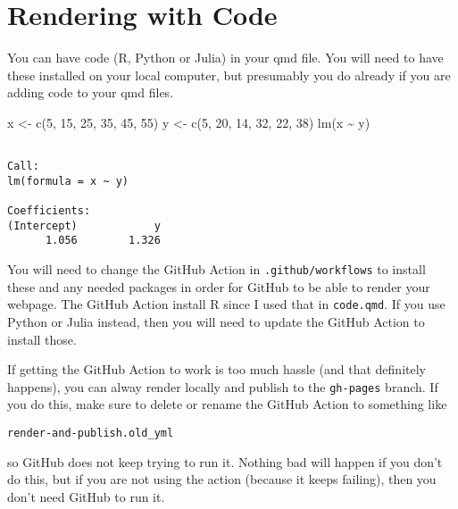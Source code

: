 \documentclass[
  11pt,
  letterpaper,
  oneside,
  open=any]{scrbook}
\newenvironment{Shaded}{\begin{snugshade}}{\end{snugshade}}
\newcommand{\DecValTok}[1]{\textcolor[rgb]{0.68,0.00,0.00}{#1}}
\newcommand{\FunctionTok}[1]{\textcolor[rgb]{0.28,0.35,0.67}{#1}}
\newcommand{\NormalTok}[1]{\textcolor[rgb]{0.00,0.23,0.31}{#1}}
\newcommand{\OtherTok}[1]{\textcolor[rgb]{0.00,0.23,0.31}{#1}}
\newcommand{\SpecialCharTok}[1]{\textcolor[rgb]{0.37,0.37,0.37}{#1}}
\begin{document}

\hypertarget{rendering-with-code}{%
\chapter{Rendering with Code}\label{rendering-with-code}}

You can have code (R, Python or Julia) in your qmd file. You will need
to have these installed on your local computer, but presumably you do
already if you are adding code to your qmd files.

\begin{Shaded}
\begin{Highlighting}[]
\NormalTok{x }\OtherTok{\textless{}{-}} \FunctionTok{c}\NormalTok{(}\DecValTok{5}\NormalTok{, }\DecValTok{15}\NormalTok{, }\DecValTok{25}\NormalTok{, }\DecValTok{35}\NormalTok{, }\DecValTok{45}\NormalTok{, }\DecValTok{55}\NormalTok{)}
\NormalTok{y }\OtherTok{\textless{}{-}} \FunctionTok{c}\NormalTok{(}\DecValTok{5}\NormalTok{, }\DecValTok{20}\NormalTok{, }\DecValTok{14}\NormalTok{, }\DecValTok{32}\NormalTok{, }\DecValTok{22}\NormalTok{, }\DecValTok{38}\NormalTok{)}
\FunctionTok{lm}\NormalTok{(x }\SpecialCharTok{\textasciitilde{}}\NormalTok{ y)}
\end{Highlighting}
\end{Shaded}

\begin{verbatim}

Call:
lm(formula = x ~ y)

Coefficients:
(Intercept)            y  
      1.056        1.326  
\end{verbatim}

You will need to change the GitHub Action in \texttt{.github/workflows}
to install these and any needed packages in order for GitHub to be able
to render your webpage. The GitHub Action install R since I used that in
\texttt{code.qmd}. If you use Python or Julia instead, then you will
need to update the GitHub Action to install those.

If getting the GitHub Action to work is too much hassle (and that
definitely happens), you can alway render locally and publish to the
\texttt{gh-pages} branch. If you do this, make sure to delete or rename
the GitHub Action to something like

\begin{verbatim}
render-and-publish.old_yml
\end{verbatim}

so GitHub does not keep trying to run it. Nothing bad will happen if you
don't do this, but if you are not using the action (because it keeps
failing), then you don't need GitHub to run it.
\end{document}
